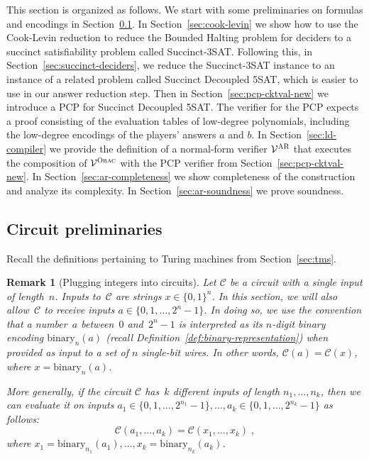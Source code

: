 \documentclass[11pt]{article}
\newtheorem{remark}[theorem]{Remark}
\theoremstyle{definition}
\newcommand{\verifier}{\mathcal{V}}
\newcommand{\gamestyle}[1]{\ensuremath{\textsc{#1}}\xspace}
\newcommand{\ora}{\gamestyle{Orac}}
\newcommand{\ar}{\gamestyle{AR}}
\newcommand{\circuit}{\mathcal{C}}
\newcommand{\binary}[1]{\mathrm{binary}_{#1}}
\begin{document}
This section is organized as follows.
We start with some preliminaries on formulas and encodings in
Section~\ref{sec:ar-tms}.
In Section~\ref{sec:cook-levin} we show how to use the Cook-Levin reduction to
reduce the Bounded Halting problem for deciders to a succinct satisfiability
problem called Succinct-3SAT.
Following this, in Section~\ref{sec:succinct-deciders}, we reduce the
Succinct-3SAT instance to an instance of a related problem called Succinct
Decoupled 5SAT, which is easier to use in our answer reduction step.
Then in Section~\ref{sec:pcp-cktval-new} we introduce a PCP for Succinct
Decoupled 5SAT.
The verifier for the PCP expects a proof consisting of the evaluation tables of
low-degree polynomials, including the low-degree encodings of the players'
answers $a$ and $b$.
In Section~\ref{sec:ld-compiler} we provide the definition of a normal-form
verifier $\verifier^\ar$ that executes the composition of $\verifier^\ora$ with
the PCP verifier from Section~\ref{sec:pcp-cktval-new}.
In Section~\ref{sec:ar-completeness} we show completeness of the construction
and analyze its complexity.
In Section~\ref{sec:ar-soundness} we prove soundness.

\subsection{Circuit preliminaries}
\label{sec:ar-tms}

Recall the definitions pertaining to Turing machines from Section~\ref{sec:tms}. 

\begin{remark}[Plugging integers into circuits]\label{rem:plugging-in-integers}
  Let $\circuit$ be a circuit with a single input of length~$n$.
  Inputs to~$\circuit$ are strings $x \in \{0, 1\}^n$.
  In this section, we will also allow~$\circuit$ to receive inputs $a \in \{0,
  1, \ldots, 2^n-1\}$.
  In doing so, we use the convention that a number~$a$ between~$0$ and~$2^{n}-1$
  is interpreted as its $n$-digit binary encoding $\binary{n}(a)$ (recall
  Definition~\ref{def:binary-representation}) when provided as input to a set of
  $n$ single-bit wires.
  In other words, $\circuit(a) = \circuit(x)$, where $x = \binary{n}(a)$.

  More generally, if the circuit $\circuit$ has~$k$ different inputs of length
  $n_1, \ldots, n_k$, then we can evaluate it on inputs $a_1 \in \{0, 1, \ldots,
  2^{n_1}-1\}, \ldots, a_k \in \{0, 1, \ldots, 2^{n_k}-1\}$ as follows:
  \begin{equation*}
    \circuit(a_1, \ldots, a_k) = \circuit(x_1, \ldots, x_k)\;,
  \end{equation*}
  where $x_1 = \binary{n_1}(a_1), \ldots, x_k = \binary{n_k}(a_k)$.
\end{remark}
\end{document}
